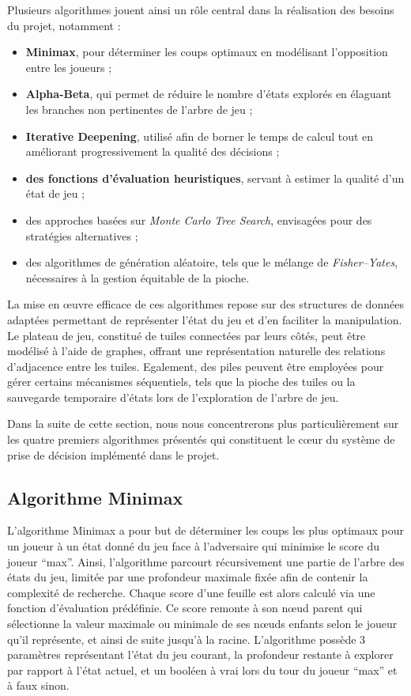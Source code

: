 \documentclass[11pt]{article}
\begin{document}
Plusieurs algorithmes jouent ainsi un rôle central dans la réalisation des besoins du projet, notamment :
\begin{itemize}
  \item[-] \textbf{Minimax}\cite{minimax}, pour déterminer les coups optimaux en modélisant l’opposition entre les joueurs ;
  \item[-] \textbf{Alpha-Beta}, qui permet de réduire le nombre d’états explorés en élaguant les branches non pertinentes de l’arbre de jeu ;
  \item[-] \textbf{Iterative Deepening}, utilisé afin de borner le temps de calcul tout en améliorant progressivement la qualité des décisions ;
  \item[-] \textbf{des fonctions d’évaluation heuristiques}, servant à estimer la qualité d’un état de jeu ;
  \item[-] des approches basées sur \textit{Monte Carlo Tree Search}\cite{monte_carlo}, envisagées pour des stratégies alternatives ;
  \item[-] des algorithmes de génération aléatoire, tels que le mélange de \textit{Fisher–Yates}, nécessaires à la gestion équitable de la pioche.
\end{itemize}

La mise en œuvre efficace de ces algorithmes repose sur des structures de données adaptées permettant de représenter l’état du jeu et d’en faciliter la manipulation. 
Le plateau de jeu, constitué de tuiles connectées par leurs côtés, peut être modélisé à l’aide de graphes, offrant une représentation naturelle des relations d’adjacence entre les tuiles. 
Egalement, des piles peuvent être employées pour gérer certains mécanismes séquentiels, tels que la pioche des tuiles ou la sauvegarde temporaire d’états lors de l’exploration de l’arbre de jeu.

Dans la suite de cette section, nous nous concentrerons plus particulièrement sur les quatre premiers algorithmes présentés qui constituent le cœur du système de prise de décision implémenté dans le projet.

\subsection{Algorithme Minimax}

L'algorithme Minimax a pour but de déterminer les coups les plus optimaux pour un joueur à un état donné du jeu face à l’adversaire qui minimise le score du joueur “max”.
Ainsi, l’algorithme parcourt récursivement une partie de l’arbre des états du jeu, limitée par une profondeur maximale fixée afin de contenir la complexité de recherche.
Chaque score d’une feuille est alors calculé via une fonction d’évaluation prédéfinie. Ce score remonte à son nœud parent qui sélectionne la valeur maximale ou minimale de ses nœuds enfants selon le joueur qu’il représente, et ainsi de suite jusqu’à la racine.
L’algorithme possède 3 paramètres représentant l’état du jeu courant, la profondeur restante à explorer par rapport à l’état actuel, et un booléen à vrai lors du tour du joueur “max” et à faux sinon.
\end{document}
